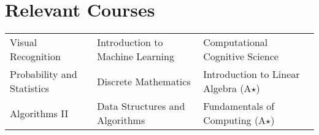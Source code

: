 
\section*{Relevant Courses}
\vspace{-2mm}
\begin{tabularx}{\textwidth}{L L L}
    Visual Recognition &
    Introduction to Machine Learning &
    Computational Cognitive Science \\
    Probability and Statistics &
    Discrete Mathematics &
    Introduction to Linear Algebra (A$\star$) \\
    Algorithms II &
    Data Structures and Algorithms &
    Fundamentals of Computing (A$\star$)
\end{tabularx}\\[-2mm]
